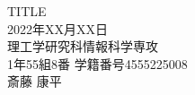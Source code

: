\documentclass[a4j]{jsarticle}
\begin{document}
\thispagestyle{empty}
\begin{center}
    \vspace*{4cm}

    \LARGE
    TITLE \\
  \vspace{9cm}
  2022年XX月XX日 \\
  \vspace{1cm}
  理工学研究科情報科学専攻　\\
  \vspace{1cm}
  1年55組8番 学籍番号4555225008\\
  \vspace{2cm}
  斎藤 康平

\end{center}
\setcounter{page}{0}

\newpage

% 

% 
\end{document}
